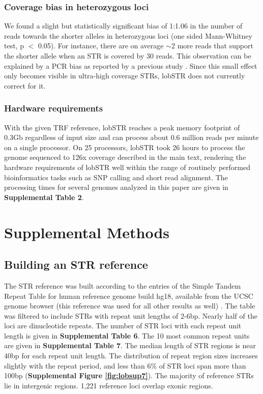 \subsubsection{Coverage bias in heterozygous loci}
We found a slight but statistically significant bias of 1:1.06 in the number of reads towards the shorter alleles in heterozygous loci (one sided Mann-Whitney test, p $<$ 0.05). For instance, there are on average $\sim$2 more reads that support the shorter allele when an STR is covered by 30 reads.  This observation can be explained by a PCR bias as reported by a previous study \cite{WattierEngelSaumitou-LapradeEtAl1998}. Since this small effect only becomes visible in ultra-high coverage STRs, lobSTR does not currently correct for it.

\subsubsection{Hardware requirements}
With the given TRF reference, lobSTR reaches a peak memory footprint of 0.3Gb regardless of input size and can process about 0.6 million reads per minute on a single processor. On 25 processors, lobSTR took 26 hours to process the genome sequenced to 126x coverage described in the main text, rendering the hardware requirements of lobSTR well within the range of routinely performed bioinformatics tasks such as SNP calling and short read alignment. The processing times for several genomes analyzed in this paper are given in \textbf{Supplemental Table 2}. 

\section{Supplemental Methods}
\subsection{Building an STR reference}
The STR reference was built according to the entries of the Simple Tandem Repeat Table for human reference genome build hg18, available from the UCSC genome browser (this reference was used for all other results as well) \cite{Kent2002}. The table was filtered to include STRs with repeat unit lengths of 2-6bp. Nearly half of the loci are dinucleotide repeats. The number of STR loci with each repeat unit length is given in \textbf{Supplemental Table 6}. The 10 most common repeat units are given in \textbf{Supplemental Table 7}. The median length of STR regions is near 40bp for each repeat unit length. The distribution of repeat region sizes increases slightly with the repeat period, and less than 6\% of STR loci span more than 100bp (\textbf{Supplemental Figure \ref{fig:lobsup7}}). The majority of reference STRs lie in intergenic regions. 1,221 reference loci overlap exonic regions.


